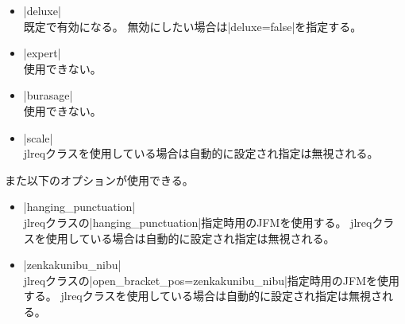 \documentclass[dvipdfmx,a4paper,jis2004]{jlreq}
\newcommand{\cls}[1]{\textsf{#1}}
\begin{document}
\begin{itemize}
\item |deluxe|\\
  既定で有効になる。
  無効にしたい場合は|deluxe=false|を指定する。
\item |expert|\\
  使用できない。
\item |burasage|\\
  使用できない。
\item |scale|\\
  \cls{jlreq}クラスを使用している場合は自動的に設定され指定は無視される。
\end{itemize}

また以下のオプションが使用できる。

\begin{itemize}
\item |hanging_punctuation|\\
  \cls{jlreq}クラスの|hanging_punctuation|指定時用のJFMを使用する。
  \cls{jlreq}クラスを使用している場合は自動的に設定され指定は無視される。
\item |zenkakunibu_nibu|\\
  \cls{jlreq}クラスの|open_bracket_pos=zenkakunibu_nibu|指定時用のJFMを使用する。
  \cls{jlreq}クラスを使用している場合は自動的に設定され指定は無視される。
\end{itemize}
\end{document}
